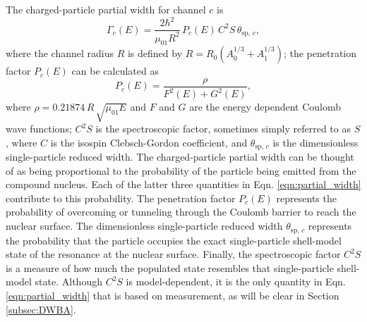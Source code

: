The charged-particle partial width for channel $c$ is
\begin{equation} \label{eqn:partial_width}
\Gamma_{c}(E) = \frac{2 \hbar^{2}}{\mu_{01} R^{2}} \, P_{c}(E) \, C^{2}S \, \theta_{\mathrm{sp}, \, c},
\end{equation}
where the channel radius $R$ is defined by $R = R_{0} \left( A_{0}^{1/3} + A_{1}^{1/3} \right)$; the penetration factor $P_{c}(E)$ can be calculated as
\begin{equation}
P_{c}(E) = \frac{\rho}{F^{2}(E) + G^{2}(E)},
\end{equation}
where $\rho = 0.21874 \, R \, \sqrt{\mu_{01} E}$ and $F$ and $G$ are the energy dependent Coulomb wave functions; $C^{2}S$ is the spectroscopic factor, sometimes simply referred to as $S$, where $C$ is the isospin Clebsch-Gordon coefficient, and $\theta_{\mathrm{sp}, \, c}$ is the dimensionless single-particle reduced width. The charged-particle partial width can be thought of as being proportional to the probability of the particle being emitted from the compound nucleus. Each of the latter three quantities in Eqn. \ref{eqn:partial_width} contribute to this probability. The penetration factor $P_{c}(E)$ represents the probability of overcoming or tunneling through the Coulomb barrier to reach the nuclear surface. The dimensionless single-particle reduced width $\theta_{\mathrm{sp}, \, c}$ represents the probability that the particle occupies the exact single-particle shell-model state of the resonance at the nuclear surface. Finally, the spectroscopic factor $C^{2}S$ is a measure of how much the populated state resembles that single-particle shell-model state. Although $C^{2}S$ is model-dependent, it is the only quantity in Eqn. \ref{eqn:partial_width} that is based on measurement, as will be clear in Section \ref{subsec:DWBA}.

